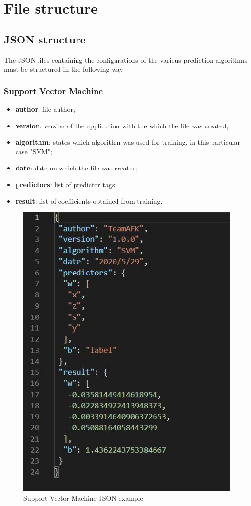 \section{File structure}
\subsection{JSON structure}
The JSON files containing the configurations of the various prediction algorithms must be structured in the following way

\subsubsection{Support Vector Machine}
\begin{itemize}
	\item \textbf{author}: file author;
	\item \textbf{version}: version of the application with the which the file was created;
	\item \textbf{algorithm}: states which algorithm was used for training, in this particular case "SVM";
	\item \textbf{date}: date on which the file was created;
	\item \textbf{predictors}: list of predictor tags;
	\item \textbf{result}: list of coefficients obtained from training.
\end{itemize}
\begin{figure}[H]
\centering
\includegraphics[scale=0.65]{img/json/jsonSVM.jpg}
\caption{Support Vector Machine JSON example}
\end{figure}
\newpage

